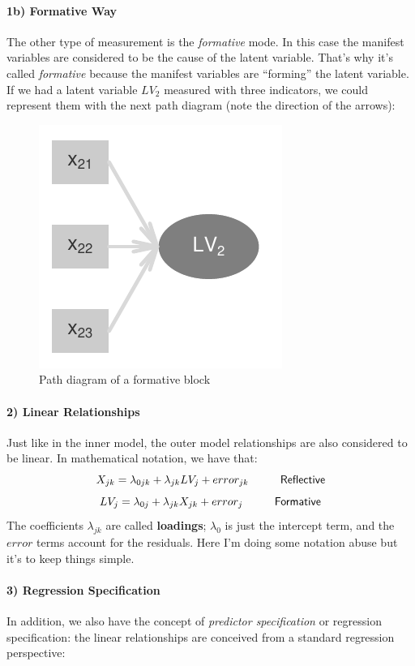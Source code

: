 \documentclass[12pt]{book}\usepackage{graphicx, color}
\newenvironment{knitrout}{}{} %
\begin{document}
\paragraph{1b) Formative Way}
The other type of measurement is the \textit{formative} mode. In this case the manifest variables are considered to be the cause of the latent variable. That's why it's called \textit{formative} because the manifest variables are ``forming'' the latent variable. If we had a latent variable $LV_2$ measured with three indicators, we could represent them with the next path diagram (note the direction of the arrows):
\begin{knitrout}
\color{fgcolor}\begin{figure}[h]


{\centering \includegraphics[width=.25\linewidth,height=.25\linewidth]{figure/formative_way} 

}

\caption[Path diagram of a formative block]{Path diagram of a formative block\label{fig:formative_way}}
\end{figure}


\end{knitrout}


\paragraph{2) Linear Relationships} Just like in the inner model, the outer model relationships are also considered to be linear. In mathematical notation, we have that:
$$ X_{jk} = \lambda_{0jk} + \lambda_{jk} LV_j + error_{jk}   \hspace{10mm}  \mathsf{Reflective}$$
$$ LV_j = \lambda_{0j} + \lambda_{jk} X_{jk} + error_j   \hspace{10mm}  \mathsf{Formative}$$
The coefficients $\lambda_{jk}$ are called \textbf{loadings}; $\lambda_{0}$ is just the intercept term, and the $error$ terms account for the residuals. Here I'm doing some notation abuse but it's to keep things simple.

\paragraph{3) Regression Specification} In addition, we also have the concept of \textit{predictor specification} or regression specification: the linear relationships are conceived from a standard regression perspective:
\end{document}
